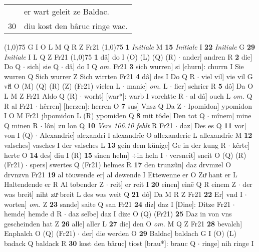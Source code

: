 \documentclass[8pt,a4paper,notitlepage]{article}
\begin{document}
\begin{table}[ht]
\begin{minipage}[t]{0.5\linewidth}
\begin{tabular}{rl}
 & er wart geleit ze Baldac.\\ 
30 & diu kost den bâruc ringe wac.\\ 
\end{tabular}
\scriptsize
\line(1,0){75} \newline
G I O L M Q R Z Fr21 \newline
\line(1,0){75} \newline
\textbf{1} \textit{Initiale} M  \textbf{15} \textit{Initiale} I  \textbf{22} \textit{Initiale} G  \textbf{29} \textit{Initiale} I L Q Z Fr21  \newline
\line(1,0){75} \newline
\textbf{1} dâ] do I (O) (L) (Q) (R)  $\cdot$ ander] andren R \textbf{2} die] Do Q  $\cdot$ sich] sie Q  $\cdot$ dâ] do I Q \textit{om.} Fr21 \textbf{3} sich wurren] si [churn]: churrn I Sie wurren Q Sich wurrer Z Sich wirrten Fr21 \textbf{4} dâ] des I Do Q R  $\cdot$ viel vil] vie vil G viͤl O (M) (Q) (R) (Z) (Fr21) vielen L  $\cdot$ manic] \textit{om.} L  $\cdot$ fier] schrier R \textbf{5} dô] Da O L M Z Fr21 Aldo Q (R)  $\cdot$ worht] [war*]: warb I vorchtte R  $\cdot$ al dâ] ouch L \textit{om.} Q R al Fr21  $\cdot$ hêrren] [herzen]: herren O \textbf{7} sus] Vnsz Q Da Z  $\cdot$ Ipomidon] ypomidon I O M Fr21 jhpomidon L (R) ypomiden Q \textbf{8} mit tôde] Den tot Q  $\cdot$ mînem] minē Q minen R  $\cdot$ lôn] zu lon Q \textbf{10} \textit{Vers 106.10 fehlt} R Fr21   $\cdot$ daz] Des es Q \textbf{11} vor] von I (Q)  $\cdot$ Alexandrie] alexandri I alexandrîe O allexanderie L allexandrie M \textbf{12} valsches] vasches I der valsches L \textbf{13} gein dem künige] Ge in der kung R  $\cdot$ kêrte] herte O \textbf{14} des] diu I (R) \textbf{15} sînen helm] ÷in heln I  $\cdot$ versneit] sneit O (Q) (R) (Fr21)  $\cdot$ spers] swertes Q (Fr21) helmes R \textbf{17} den trunzûn] daz drvmzel O drvnzvn Fr21 \textbf{19} al töuwende er] al dewende I Ettewenne er O Zuͯ hant er L Haltendende er R Al tobender Z  $\cdot$ reit] er reit I \textbf{20} einen] einē Q R einem Z  $\cdot$ der was breit] niht zuͯ breit L des was weit Q \textbf{21} dô] Da M R Z Fr21 \textbf{22} Er] vnd I  $\cdot$ worten] \textit{om.} Z \textbf{23} sande] saite Q san Fr21 \textbf{24} diz] daz I [Dine]: Ditze Fr21  $\cdot$ hemde] hemde d R  $\cdot$ daz selbe] daz I dize O (Q) (Fr21) \textbf{25} Daz in von vns gescheinden hat Z \textbf{26} alle] aller L \textbf{27} die] den O \textit{om.} M Q Z Fr21 \textbf{28} bevalch] Enphalch O (Q) (Fr21)  $\cdot$ der] die werden O \textbf{29} Baldac] baldach G I (O) (L) badack Q baldack R \textbf{30} kost den bâruc] tiost [brau*]: brauc Q  $\cdot$ ringe] nih ringe I \newline

\end{minipage}
\end{table}
\end{document}
